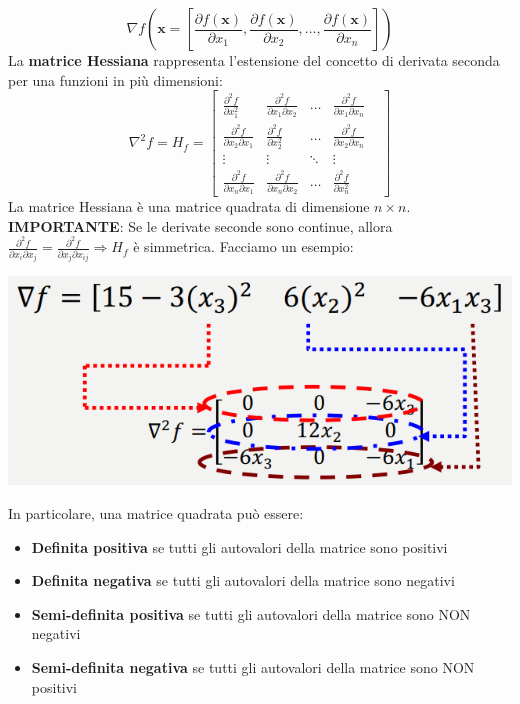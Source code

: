 \documentclass[12pt]{article}
\begin{document}
$$\nabla f(\boldsymbol{x} = \left [ \frac{\partial f( \boldsymbol{x})}{\partial x_1}, \frac{ \partial f(\boldsymbol{x})}{\partial x_2}, \dots, \frac{ \partial f(\boldsymbol{x})}{\partial x_n}  \right ])$$
La \textbf{matrice Hessiana} rappresenta l'estensione del concetto di derivata seconda per una funzioni in più dimensioni:
$$\nabla^2 f = H_f = \begin{bmatrix}
    \frac{\partial^2 f}{\partial x_1^2} & \frac{\partial^2 f}{\partial x_1 \partial x_2}  & \dots & \frac{\partial^2 f}{\partial x_1 \partial x_n} \\
    \frac{\partial^2 f}{\partial x_2 \partial x_1} & \frac{\partial^2 f}{\partial x_2^2} & \dots & \frac{\partial^2 f}{\partial x_2 \partial x_n} \\
    \vdots & \vdots & \ddots & \vdots & \\
    \frac{\partial^2 f}{\partial x_n \partial x_1} & \frac{\partial^2 f}{\partial x_n \partial x_2} & \dots & \frac{\partial^2 f}{\partial x_n^2}
\end{bmatrix}$$
La matrice Hessiana è una matrice quadrata di dimensione $n \times n$. \newline 
\textbf{IMPORTANTE}: Se le derivate seconde sono continue, allora $\frac{\partial^2 f}{\partial x_i \partial x_j} = \frac{\partial^2 f}{\partial x_j \partial x_{ij}} \Rightarrow H_f$ è simmetrica. \newline
Facciamo un esempio:
\begin{center}
    \includegraphics[width = 0.50\linewidth]{Images/101.PNG}
\end{center}
In particolare, una matrice quadrata può essere:
\begin{itemize}
    \item \textbf{Definita positiva} se tutti gli autovalori della matrice sono positivi
    \item \textbf{Definita negativa} se tutti gli autovalori della matrice sono negativi
    \item \textbf{Semi-definita positiva} se tutti gli autovalori della matrice sono NON negativi
    \item \textbf{Semi-definita negativa} se tutti gli autovalori della matrice sono NON positivi
\end{itemize}
\end{document}
